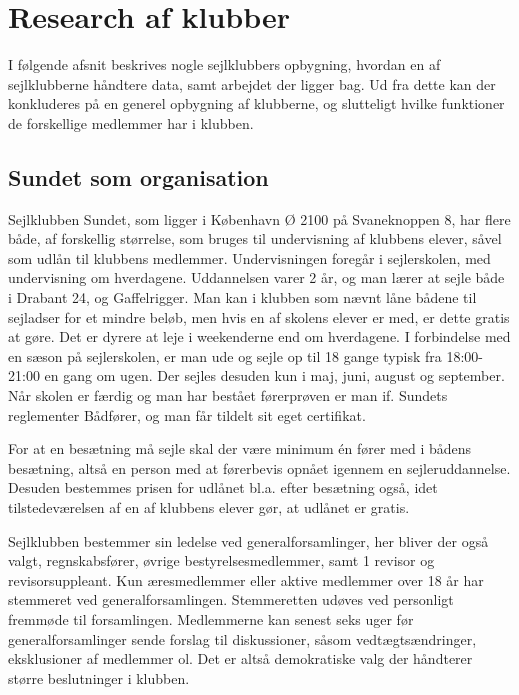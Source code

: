 \section{Research af klubber}\label{sec:research}

I følgende afsnit beskrives nogle sejlklubbers opbygning, hvordan en af sejlklubberne håndtere data, samt arbejdet der
ligger bag. Ud fra dette kan der konkluderes på en generel opbygning af klubberne, og slutteligt hvilke funktioner de
forskellige medlemmer har i klubben.

\subsection{Sundet som organisation}

Sejlklubben Sundet, som ligger i København Ø 2100 på Svaneknoppen 8, har flere både, af forskellig størrelse, som bruges
til undervisning af klubbens elever, såvel som udlån til klubbens medlemmer. Undervisningen foregår i sejlerskolen, med
undervisning om hverdagene. Uddannelsen varer 2 år, og man lærer at sejle både i Drabant 24, og
Gaffelrigger. Man kan i klubben som nævnt låne bådene
til sejladser for et mindre beløb, men hvis en af skolens elever er med, er dette gratis at gøre. Det er dyrere at leje
i weekenderne end om hverdagene. I forbindelse med en sæson på sejlerskolen, er man ude og sejle op til 18 gange typisk
fra 18:00-21:00 en gang om ugen. Der sejles desuden kun i maj, juni, august og september. Når skolen er færdig og man
har bestået førerprøven er man if. Sundets reglementer Bådfører, og man får tildelt sit eget certifikat.

For at en besætning må sejle skal der være minimum én fører med i bådens besætning, altså en person med at førerbevis
opnået igennem en sejleruddannelse. Desuden bestemmes prisen for udlånet bl.a. efter besætning også, idet
tilstedeværelsen af en af klubbens elever gør, at udlånet er gratis.\citep{Sundet}

Sejlklubben bestemmer sin ledelse ved generalforsamlinger, her bliver der også valgt, regnskabsfører, øvrige
bestyrelsesmedlemmer, samt 1 revisor og revisorsuppleant. Kun æresmedlemmer eller aktive medlemmer over 18 år har
stemmeret ved generalforsamlingen. Stemmeretten udøves ved personligt fremmøde til forsamlingen. Medlemmerne kan senest
seks uger før generalforsamlinger sende forslag til diskussioner, såsom vedtægtsændringer, eksklusioner af medlemmer
ol. Det er altså demokratiske valg der håndterer større beslutninger i klubben.

